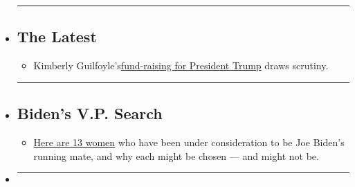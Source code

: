 \begin{itemize}
\item
  \begin{center}\rule{0.5\linewidth}{\linethickness}\end{center}

  \hypertarget{the-latest}{%
  \subsection{The Latest}\label{the-latest}}

  \begin{itemize}
  \tightlist
  \item
    Kimberly
    Guilfoyle's\href{https://www.nytimes3xbfgragh.onion/2020/07/24/us/politics/kimberly-guilfoyles-trump-fundraising.html?action=click\&pgtype=Article\&state=default\&module=styln-elections-2020\&region=BELOW_MAIN_CONTENT\&context=storylines_guide}{}\href{https://www.nytimes3xbfgragh.onion/2020/07/24/us/politics/kimberly-guilfoyles-trump-fundraising.html?action=click\&pgtype=Article\&state=default\&module=styln-elections-2020\&region=BELOW_MAIN_CONTENT\&context=storylines_guide}{fund-raising
    for President Trump} draws scrutiny.
  \end{itemize}
\item
  \begin{center}\rule{0.5\linewidth}{\linethickness}\end{center}

  \hypertarget{bidens-vp-search}{%
  \subsection{Biden's V.P. Search}\label{bidens-vp-search}}

  \begin{itemize}
  \tightlist
  \item
    \href{https://www.nytimes3xbfgragh.onion/article/biden-vice-president-2020.html?action=click\&pgtype=Article\&state=default\&module=styln-elections-2020\&region=BELOW_MAIN_CONTENT\&context=storylines_guide}{Here
    are 13 women} who have been under consideration to be Joe Biden's
    running mate, and why each might be chosen --- and might not be.
  \end{itemize}
\item
  \begin{center}\rule{0.5\linewidth}{\linethickness}\end{center}

  \hypertarget{keep-up-with-our-coverage}{%
}
\end{itemize}
